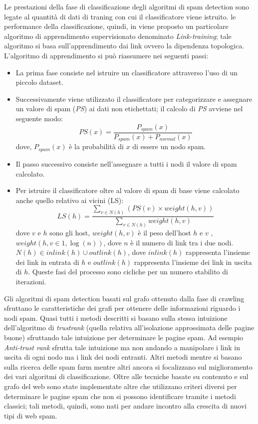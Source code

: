 Le prestazioni della fase di classificazione degli algoritmi di spam detection sono legate al quantità di dati di traning con cui il classificatore viene istruito.  le performance della classificazione, quindi, in \cite{Geng:2009:LBS:1526709.1526920} viene proposto un particolare algoritmo di apprendimento supervisionato denominato \textit{Link-training}; tale algoritmo si basa sull'apprendimento dai link ovvero la dipendenza topologica. L'algoritmo di apprendimento si può riassumere nei seguenti passi:
\begin{itemize}
 \item La prima fase consiste nel istruire un classificatore attraverso l'uso di un piccolo dataset.
 \item Successivamente viene utilizzato il classificatore per categorizzare e assegnare un valore di spam (\textit{PS}) ai dati non etichettati; il calcolo di \textit{PS} avviene nel seguente modo:
 \begin{equation}
  PS(x)=\frac{P_{spam}(x)}{P_{spam}(x)+P_{normal}(x)}
 \end{equation}
 dove, \(P_{spam}(x)\) è la probabilità di \(x\) di essere un nodo spam.
 \item Il passo successivo consiste nell'assegnare a tutti i nodi il valore di spam calcolato.
 \item Per istruire il classificatore oltre al valore di spam di base viene calcolato anche quello relativo ai vicini (LS):
 \begin{equation}
LS(h)=\frac{\sum_{v\in N(h)}(PS(v)\times weight(h,v))}{\sum_{v\in N(h)}weight(h,v)}
 \end{equation}
dove \(v\) e \(h\) sono gli host, \(weight(h,v)\) è il peso dell'host \(h\) e \(v\) , \(weight(h,v\in {1,\log{(n)}})\), dove \(n\) è il numero di link tra i due nodi. \(N(h)\in inlink(h) \cup outlink(h)\), dove \(inlink(h)\) rappresenta l'insieme dei link in entrata di \(h\) e \(outlink(h)\) rappresenta l'insieme dei link in uscita di \(h\). 
Queste fasi del processo sono cicliche per un numero stabilito di iterazioni.
\end{itemize}

Gli algoritmi di spam detection basati sul grafo ottenuto dalla fase di crawling sfruttano le caratteristiche dei grafi per ottenere delle informazioni riguardo i nodi spam. Quasi tutti i metodi descritti si basano sulla stessa intuizione dell'algoritmo di \textit{trustrank} (quella relativa all'isolazione approssimata delle pagine buone) sfruttando tale intuizione per determinare le pagine spam. Ad esempio \textit{Anti-trust rank} sfrutta tale intuizione ma non andando a manipolare i link in uscita di ogni nodo ma i link dei nodi entranti. Altri metodi mentre si basano sulla ricerca delle spam farm mentre altri ancora si focalizzano sul miglioramento dei vari algoritmi di classificazione. Oltre alle tecniche basate su contenuto e sul grafo del web sono state implementate altre che utilizzano criteri diversi per determinare le pagine spam che non si possono identificare tramite i metodi classici; tali metodi, quindi, sono nati per andare incontro alla crescita di nuovi tipi di web spam.




